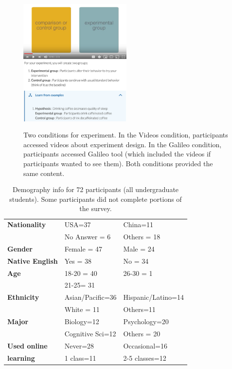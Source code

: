 \begin{figure}[t] 
  \includegraphics[width=0.5\textwidth]{figures/galileo/galileo-study-1}
  \includegraphics[width=0.5\textwidth]{figures/galileo/galileo-study-2}
  \caption[Two conditions for experiment: Videos and Galileo]
{Two conditions for experiment. In the Videos condition, participants accessed videos about experiment design. In the Galileo condition, participants accessed Galileo tool (which included the videos if participants wanted to see them). Both conditions provided the same content. }
  \label{fig:galileo-study}
\end{figure}

\vspace{0.25in}
\begin{table}[!ht]
\caption[Demography info for 72 participants (all undergraduate students)] 
{Demography info for 72 participants (all undergraduate students). Some participants did not complete portions of the survey.}

\vspace{-0.25in}
\begin{center}
\begin{tabular}{|>{\bf}p{1in}|p{1.5in}|p{1.5in}|}
\hline
Nationality	&	USA=37		&	China=11\\
			&	No Answer = 6	&	Others = 18\\
Gender		&	Female = 47	&	Male = 24\\
Native English	&	Yes = 38 		&	No = 34\\
Age			&	18-20 = 40	& 	26-30 = 1\\
			&	21-25= 31	&			\\
Ethnicity		&	Asian/Pacific=36 & 	Hispanic/Latino=14\\
			&	White = 11		&	Others=11 \\
Major		&	Biology=12	& 	Psychology=20 \\
			&	Cognitive Sci=12 &	 Others = 20 \\
Used online	& 	Never=28		&	Occasional=16\\
learning		&	1 class=11	&	2-5 classes=12\\
\hline
\end{tabular}
\end{center}
\label{tab:gi-results1}
\end{table}


